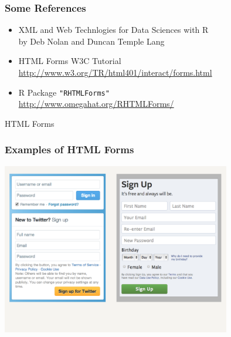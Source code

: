 \documentclass{beamer}\usepackage[]{graphicx}\usepackage[]{color}
\newcommand{\code}[1]{\texttt{#1}}
\newcommand{\low}[1]{\textcolor{lowlight}{#1}}
\begin{document}

\begin{frame}
\frametitle{Some References}

\begin{itemize}
 \item XML and Web Technlogies for Data Sciences with R \\
 \low{by Deb Nolan and Duncan Temple Lang}
 \item HTML Forms W3C Tutorial \\
 {\scriptsize \url{http://www.w3.org/TR/html401/interact/forms.html}}
 \item R Package \code{"RHTMLForms"} \\
 {\scriptsize \url{http://www.omegahat.org/RHTMLForms/}}
\end{itemize}

\end{frame}


\begin{frame}
 \begin{center}
  \Huge{\textcolor{mandarina}{HTML Forms}}
 \end{center}
\end{frame}


\begin{frame}[fragile]
\frametitle{Examples of HTML Forms}

\begin{center}
\includegraphics[width=10cm]{images/html_form_twitter_facebook.pdf}
\end{center}

\end{frame}
\end{document}
